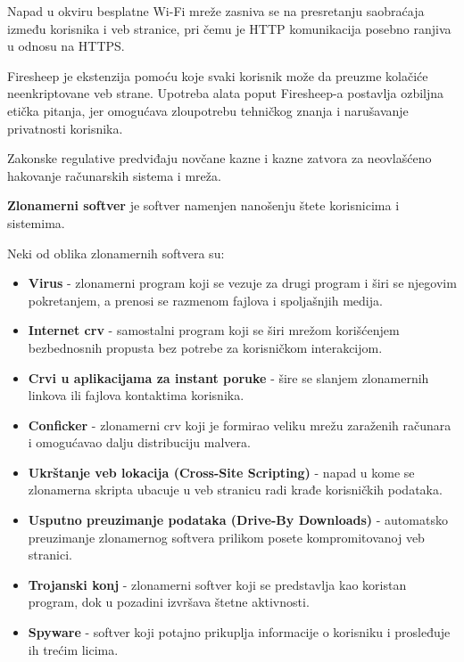 \documentclass[a4paper, 12pt]{article}
\begin{document}
Napad u okviru besplatne Wi-Fi mreže zasniva se na presretanju saobraćaja između
korisnika i veb stranice, pri čemu je HTTP komunikacija posebno ranjiva u odnosu
na HTTPS.

Firesheep je ekstenzija pomoću koje svaki korisnik može da preuzme kolačiće neenkriptovane veb strane.
Upotreba alata poput Firesheep-a postavlja ozbiljna etička pitanja, jer omogućava
zloupotrebu tehničkog znanja i narušavanje privatnosti korisnika.

Zakonske regulative predviđaju novčane kazne i kazne zatvora za neovlašćeno hakovanje
računarskih sistema i mreža.

\textbf{Zlonamerni softver} je softver namenjen nanošenju štete korisnicima i sistemima.

Neki od oblika zlonamernih softvera su:
\begin{itemize}
\item \textbf{Virus} - zlonamerni program koji se vezuje za drugi program i širi
    se njegovim pokretanjem, a prenosi se razmenom fajlova i spoljašnjih medija.

    \item \textbf{Internet crv} - samostalni program koji se širi mrežom korišćenjem
    bezbednosnih propusta bez potrebe za korisničkom interakcijom.

    \item \textbf{Crvi u aplikacijama za instant poruke} - šire se slanjem zlonamernih
    linkova ili fajlova kontaktima korisnika.

    \item \textbf{Conficker} - zlonamerni crv koji je formirao veliku mrežu zaraženih
    računara i omogućavao dalju distribuciju malvera.

    \item \textbf{Ukrštanje veb lokacija (Cross-Site Scripting)} - napad u kome se
    zlonamerna skripta ubacuje u veb stranicu radi krađe korisničkih podataka.

    \item \textbf{Usputno preuzimanje podataka (Drive-By Downloads)} - automatsko
    preuzimanje zlonamernog softvera prilikom posete kompromitovanoj veb stranici.

    \item \textbf{Trojanski konj} - zlonamerni softver koji se predstavlja kao koristan
    program, dok u pozadini izvršava štetne aktivnosti.

    \item \textbf{Spyware} - softver koji potajno prikuplja informacije o korisniku i
    prosleđuje ih trećim licima.


\end{itemize}
\end{document}
